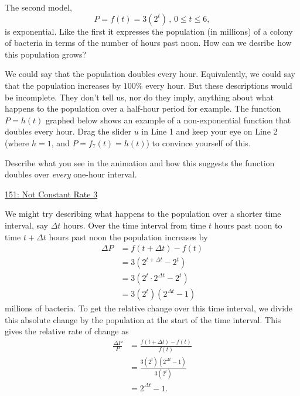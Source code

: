 \documentclass{ximera}
\begin{document}

The second model,
\[
   P =f(t) =3 (2^t) \, , \, 0\leq t \leq 6 ,
\]
is exponential. Like the first it expresses the population (in millions) of a colony of bacteria in terms of the number of hours past noon. How can we desribe how this population grows?

We could say that the population doubles every hour. Equivalently, we could say that the population increases by $100\%$ every hour. But these descriptions would be incomplete. They don't tell us, nor do they imply, anything about what happens to the population over a half-hour period for example. The function $P=h(t)$ graphed below shows an example of a non-exponential function that doubles every hour. Drag the slider $u$ in Line 1 and keep your eye on Line 2 (where $h=1$, and $P=f_7(t) = h(t)$) to convince yourself of this.

\begin{question} \label{WEWMRNERer}
Describe what you see in the animation and how this suggests the function doubles over \emph{every} one-hour interval.
\end{question}

\href{https://www.desmos.com/calculator/zapwlt6qju}{151: Not Constant Rate 3} 

 
\begin{onlineOnly}
    \begin{center}
\end{center}
\end{onlineOnly}


We might try describing what happens to the population over a shorter time interval, say $\Delta t$ hours. Over the time interval from time $t$ hours past noon to time $t+\Delta t$ hours past noon the population increases by 
\begin{align*}
  \Delta P &=  f(t + \Delta t) - f(t)  \\ 
                               &=  3 (2^{t+\Delta t} - 2^t) \\
                               &=  3 (2^t \cdot 2^{\Delta t} - 2^t) \\
                               &=  3 (2^t) (2^{\Delta t} - 1) 
\end{align*}
millions of bacteria. To get the relative change over this time interval, we divide this absolute change by the population at the start of the time interval. This gives the relative rate of change as
\begin{align*}
   \frac{\Delta P}{P} &=  \frac{f(t + \Delta t) - f(t)}{f(t)}  \\ 
                              &= \frac{3 (2^t) (2^{\Delta t} - 1)}{3 (2^t)} \\
                              &= 2^{\Delta t} - 1.
\end{align*}
\end{document}
